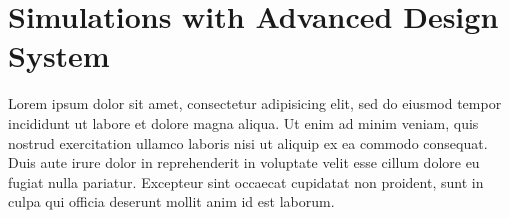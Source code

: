 \documentclass[report.tex]{subfiles}
\begin{document}
\section{Simulations with Advanced Design System}
Lorem ipsum dolor sit amet, consectetur adipisicing elit, sed do eiusmod tempor incididunt ut labore et dolore magna aliqua. Ut enim ad minim veniam, quis nostrud exercitation ullamco laboris nisi ut aliquip ex ea commodo consequat. Duis aute irure dolor in reprehenderit in voluptate velit esse cillum dolore eu fugiat nulla pariatur. Excepteur sint occaecat cupidatat non proident, sunt in culpa qui officia deserunt mollit anim id est laborum.








\end{document}
